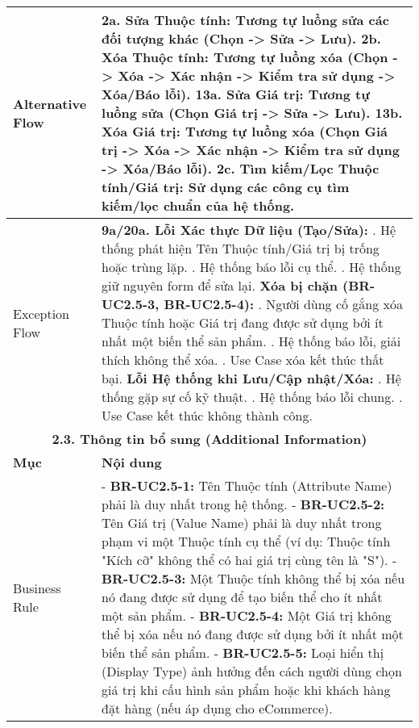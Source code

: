\begin{longtable}{|m{4cm}|p{11cm}|}
\hline
Alternative Flow & \textbf{2a. Sửa Thuộc tính:} Tương tự luồng sửa các đối tượng khác (Chọn -> Sửa -> Lưu). \newline \textbf{2b. Xóa Thuộc tính:} Tương tự luồng xóa (Chọn -> Xóa -> Xác nhận -> Kiểm tra sử dụng -> Xóa/Báo lỗi). \newline \textbf{13a. Sửa Giá trị:} Tương tự luồng sửa (Chọn Giá trị -> Sửa -> Lưu). \newline \textbf{13b. Xóa Giá trị:} Tương tự luồng xóa (Chọn Giá trị -> Xóa -> Xác nhận -> Kiểm tra sử dụng -> Xóa/Báo lỗi). \newline \textbf{2c. Tìm kiếm/Lọc Thuộc tính/Giá trị:} Sử dụng các công cụ tìm kiếm/lọc chuẩn của hệ thống. \\
\hline
Exception Flow & \textbf{9a/20a. Lỗi Xác thực Dữ liệu (Tạo/Sửa):} \newline    1. Hệ thống phát hiện Tên Thuộc tính/Giá trị bị trống hoặc trùng lặp. \newline    2. Hệ thống báo lỗi cụ thể. \newline    3. Hệ thống giữ nguyên form để sửa lại. \newline \textbf{Xóa bị chặn (BR-UC2.5-3, BR-UC2.5-4):} \newline    1. Người dùng cố gắng xóa Thuộc tính hoặc Giá trị đang được sử dụng bởi ít nhất một biến thể sản phẩm. \newline    2. Hệ thống báo lỗi, giải thích không thể xóa. \newline    3. Use Case xóa kết thúc thất bại. \newline \textbf{Lỗi Hệ thống khi Lưu/Cập nhật/Xóa:} \newline    1. Hệ thống gặp sự cố kỹ thuật. \newline    2. Hệ thống báo lỗi chung. \newline    3. Use Case kết thúc không thành công. \\
\hline
\multicolumn{2}{|c|}{\textbf{2.3. Thông tin bổ sung (Additional Information)}} \\
\hline
\textbf{Mục} & \textbf{Nội dung} \\
\hline
Business Rule & - \textbf{BR-UC2.5-1:} Tên Thuộc tính (Attribute Name) phải là duy nhất trong hệ thống. \newline - \textbf{BR-UC2.5-2:} Tên Giá trị (Value Name) phải là duy nhất trong phạm vi một Thuộc tính cụ thể (ví dụ: Thuộc tính "Kích cỡ" không thể có hai giá trị cùng tên là "S"). \newline - \textbf{BR-UC2.5-3:} Một Thuộc tính không thể bị xóa nếu nó đang được sử dụng để tạo biến thể cho ít nhất một sản phẩm. \newline - \textbf{BR-UC2.5-4:} Một Giá trị không thể bị xóa nếu nó đang được sử dụng bởi ít nhất một biến thể sản phẩm. \newline - \textbf{BR-UC2.5-5:} Loại hiển thị (Display Type) ảnh hưởng đến cách người dùng chọn giá trị khi cấu hình sản phẩm hoặc khi khách hàng đặt hàng (nếu áp dụng cho eCommerce). \\

\end{longtable}
